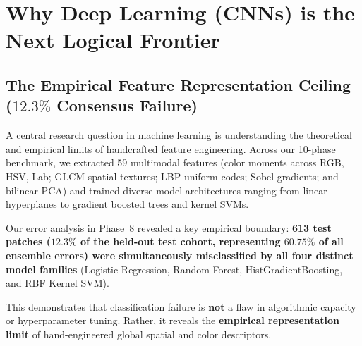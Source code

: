 \documentclass[11pt,a4paper]{article}
\begin{document}
\section{Why Deep Learning (CNNs) is the Next Logical Frontier}

\subsection{The Empirical Feature Representation Ceiling ($12.3\%$ Consensus Failure)}
A central research question in machine learning is understanding the theoretical and empirical limits of handcrafted feature engineering. Across our 10-phase benchmark, we extracted 59 multimodal features (color moments across RGB, HSV, Lab; GLCM spatial textures; LBP uniform codes; Sobel gradients; and bilinear PCA) and trained diverse model architectures ranging from linear hyperplanes to gradient boosted trees and kernel SVMs.

Our error analysis in Phase~8 revealed a key empirical boundary: \textbf{613 test patches ($12.3\%$ of the held-out test cohort, representing $60.75\%$ of all ensemble errors) were simultaneously misclassified by all four distinct model families} (Logistic Regression, Random Forest, HistGradientBoosting, and RBF Kernel SVM). 

This demonstrates that classification failure is \textbf{not} a flaw in algorithmic capacity or hyperparameter tuning. Rather, it reveals the \textbf{empirical representation limit} of hand-engineered global spatial and color descriptors.
\end{document}
